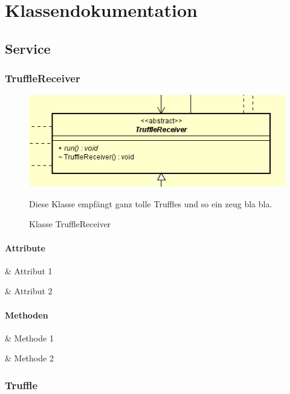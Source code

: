 \chapter{Klassendokumentation}

\section{Service}

\subsection{TruffleReceiver}

\begin{figure}[H]
    \centering
    \includegraphics{../diagramimages/TruffleReceiver.png}
    \caption[Klasse TruffleReceiver]{Klasse TruffleReceiver}
    \medskip
    Diese Klasse empfängt ganz tolle Truffles und so ein zeug bla bla.
\end{figure}

\subsubsection*{Attribute}

\begin{easylist}[itemize]

    & Attribut 1

    & Attribut 2

\end{easylist}

\subsubsection*{Methoden}

\begin{easylist}[itemize]

    & Methode 1

    & Methode 2

\end{easylist}

\subsection{Truffle}

